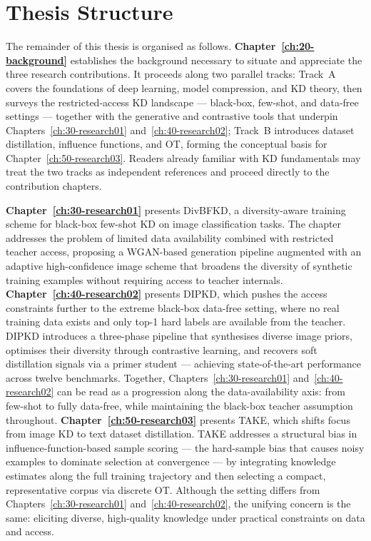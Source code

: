 \section{Thesis Structure} \label{sec:15-introduction-structure}

\begin{foldable}
  The remainder of this thesis is organised as follows.
  \textbf{Chapter~\ref{ch:20-background}} establishes the background necessary to situate and appreciate the three research contributions.
  It proceeds along two parallel tracks: Track~A covers the foundations of deep learning, model compression, and \ac{KD} theory, then surveys the restricted-access \ac{KD} landscape — black-box, few-shot, and data-free settings — together with the generative and contrastive tools that underpin Chapters~\ref{ch:30-research01} and~\ref{ch:40-research02}; Track~B introduces dataset distillation, influence functions, and \ac{OT}, forming the conceptual basis for Chapter~\ref{ch:50-research03}.
  Readers already familiar with \ac{KD} fundamentals may treat the two tracks as independent references and proceed directly to the contribution chapters.
\end{foldable}

\begin{foldable}
  \textbf{Chapter~\ref{ch:30-research01}} presents DivBFKD, a diversity-aware training scheme for black-box few-shot \ac{KD} on image classification tasks.
  The chapter addresses the problem of limited data availability combined with restricted teacher access, proposing a WGAN-based generation pipeline augmented with an adaptive high-confidence image scheme that broadens the diversity of synthetic training examples without requiring access to teacher internals.
  \textbf{Chapter~\ref{ch:40-research02}} presents DIPKD, which pushes the access constraints further to the extreme black-box data-free setting, where no real training data exists and only top-1 hard labels are available from the teacher.
  DIPKD introduces a three-phase pipeline that synthesises diverse image priors, optimises their diversity through contrastive learning, and recovers soft distillation signals via a primer student — achieving state-of-the-art performance across twelve benchmarks.
  Together, Chapters~\ref{ch:30-research01} and~\ref{ch:40-research02} can be read as a progression along the data-availability axis: from few-shot to fully data-free, while maintaining the black-box teacher assumption throughout.
  \textbf{Chapter~\ref{ch:50-research03}} presents TAKE, which shifts focus from image \ac{KD} to text dataset distillation.
  TAKE addresses a structural bias in influence-function-based sample scoring — the hard-sample bias that causes noisy examples to dominate selection at convergence — by integrating knowledge estimates along the full training trajectory and then selecting a compact, representative corpus via discrete \ac{OT}.
  Although the setting differs from Chapters~\ref{ch:30-research01} and~\ref{ch:40-research02}, the unifying concern is the same: eliciting diverse, high-quality knowledge under practical constraints on data and access.
\end{foldable}

